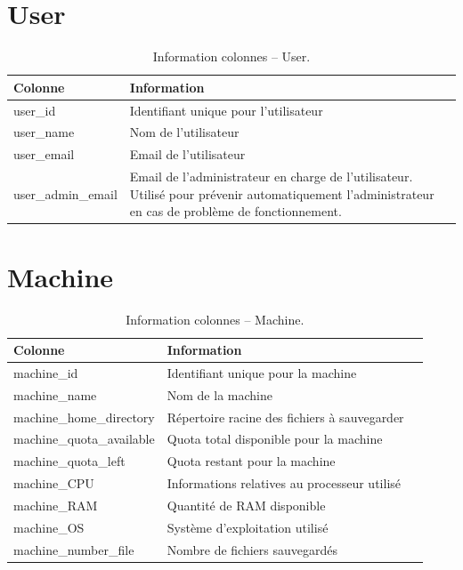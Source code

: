 \documentclass[a4paper,10pt, twoside]{report}
\begin{document}
\begin{spacing}{1.2}
\section{User}
\begin{table}[h!]
  \centering
  \def\arraystretch{1.5}
  \setlength{\fboxsep}{13pt} %
  \setlength{\fboxrule}{0pt} %
  \begin{tabular}{lm{6cm}m{6cm}}
   \rowcolor{arkred} 
    \arrayrulecolor{gray73}\hline
    \color{white} \textbf{Colonne} & \color{white} \textbf{Information}\\
    \hline
    user\_id & Identifiant unique pour l'utilisateur\\
    \hline
    user\_name & Nom de l'utilisateur\\
    \hline
    user\_email & Email de l'utilisateur\\
    \hline
    user\_admin\_email & Email de l'administrateur en charge de l'utilisateur.
    Utilisé pour prévenir automatiquement l'administrateur en cas de
    problème de fonctionnement.
  \end{tabular}
  \caption{\label{tabDBRUser} Information colonnes -- User.}
\end{table}

\section{Machine}
\begin{table}[h!]
  \centering
  \def\arraystretch{1.5}
  \setlength{\fboxsep}{13pt} %
  \setlength{\fboxrule}{0pt} %
  \begin{tabular}{lm{6cm}m{6cm}}
   \rowcolor{arkred} 
    \arrayrulecolor{gray73}\hline
    \color{white} \textbf{Colonne} & \color{white} \textbf{Information}\\
    \hline
    machine\_id & Identifiant unique pour la machine\\
    \hline
    machine\_name & Nom de la machine\\
    \hline
    machine\_home\_directory & Répertoire racine des fichiers à
    sauvegarder\\
    \hline
    machine\_quota\_available & Quota total disponible pour la machine\\
    \hline
    machine\_quota\_left & Quota restant pour la machine\\
    \hline
    machine\_CPU & Informations relatives au processeur utilisé\\
    \hline
    machine\_RAM & Quantité de RAM disponible\\
    \hline
    machine\_OS & Système d'exploitation utilisé\\
    \hline
    machine\_number\_file & Nombre de fichiers sauvegardés
  \end{tabular}
  \caption{\label{tabDBRMachine} Information colonnes -- Machine.}
\end{table}


\end{spacing}
\end{document}
